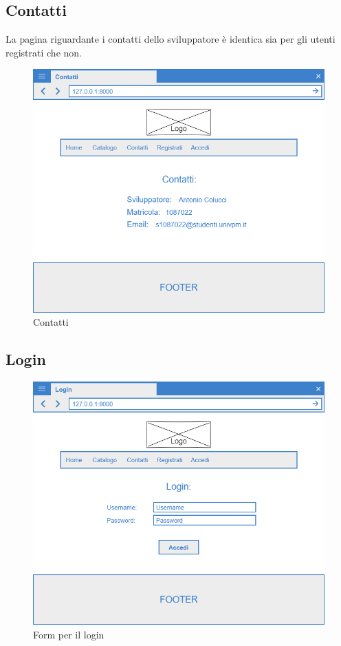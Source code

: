 \documentclass[12pt,a4paperS]{report}
\begin{document}
\begin{normalsize}
			\subsection{Contatti}
				La pagina riguardante i contatti dello sviluppatore è identica sia per gli utenti registrati che non.
				\begin{figure}[H]
					\centering
					\includegraphics[width=1\textwidth, height=1\textheight, keepaspectratio]{Mockup/Contatti.png}
					\caption{Contatti}
				\end{figure}
				
			
			\subsection{Login}
				\begin{figure}[H]
					\centering
					\includegraphics[width=1\textwidth, height=1\textheight, keepaspectratio]{Mockup/Login.png}
					\caption{Form per il login}
				\end{figure}
			

\end{normalsize}
\end{document}
